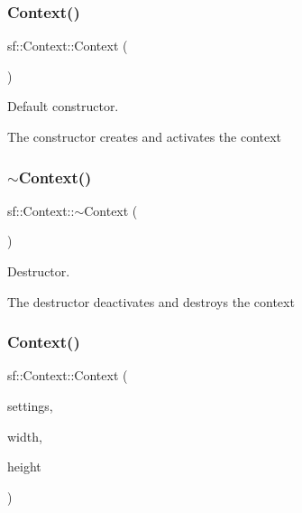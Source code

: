 \subsubsection{\texorpdfstring{Context()}{Context()}\hspace{0.1cm}{\footnotesize\ttfamily [1/2]}}
{\footnotesize\ttfamily sf\+::\+Context\+::\+Context (\begin{DoxyParamCaption}{ }\end{DoxyParamCaption})}



Default constructor. 

The constructor creates and activates the context \mbox{\label{classsf_1_1Context_a805b1bbdb3e52b1fda7c9bf2cd6ca86b}} 
\subsubsection{\texorpdfstring{$\sim$\+Context()}{~Context()}}
{\footnotesize\ttfamily sf\+::\+Context\+::$\sim$\+Context (\begin{DoxyParamCaption}{ }\end{DoxyParamCaption})}



Destructor. 

The destructor deactivates and destroys the context \mbox{\label{classsf_1_1Context_a2a9e3529e48919120e6b6fc10bad296c}} 
\subsubsection{\texorpdfstring{Context()}{Context()}\hspace{0.1cm}{\footnotesize\ttfamily [2/2]}}
{\footnotesize\ttfamily sf\+::\+Context\+::\+Context (\begin{DoxyParamCaption}\item[{const \hyperlink{structsf_1_1ContextSettings}{Context\+Settings} \&}]{settings,  }\item[{unsigned int}]{width,  }\item[{unsigned int}]{height }\end{DoxyParamCaption})}



